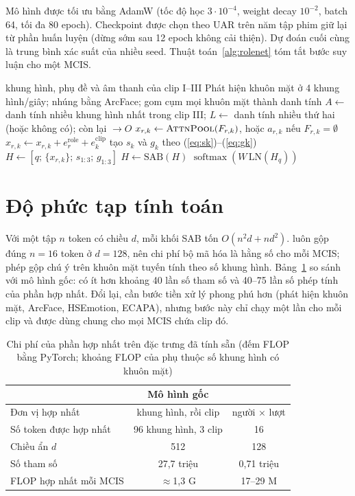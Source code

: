 Mô hình được tối ưu bằng AdamW (tốc độ học $3\cdot10^{-4}$, weight decay $10^{-2}$, batch 64, tối đa 80 epoch). Checkpoint được chọn theo UAR trên năm tập phim giữ lại từ phần huấn luyện (dừng sớm sau 12 epoch không cải thiện). Dự đoán cuối cùng là trung bình xác suất của nhiều seed. Thuật toán~\ref{alg:rolenet} tóm tắt bước suy luận cho một MCIS.

\begin{algorithm}[!htb]
\caption{Bước suy luận của \model{} cho một MCIS}
\label{alg:rolenet}
\begin{algorithmic}[1]
\Require khung hình, phụ đề và âm thanh của clip I--III
\State Phát hiện khuôn mặt ở 4 khung hình/giây; nhúng bằng ArcFace; gom cụm mọi khuôn mặt thành danh tính
\State $A \gets$ danh tính nhiều khung hình nhất trong clip III; $L \gets$ danh tính nhiều thứ hai (hoặc không có); còn lại $\to O$
  \State $x_{r,k} \gets \textsc{AttnPool}(F_{r,k})$, hoặc $a_{r,k}$ nếu $F_{r,k} = \emptyset$
  \State $x_{r,k} \gets x_{r,k} + e^{\text{role}}_r + e^{\text{clip}}_k$
\EndFor
{} \State tạo $s_k$ và $g_k$ theo (\ref{eq:sk})--(\ref{eq:gk}) \EndFor
\State $H \gets [q;\, \{x_{r,k}\};\, s_{1:3};\, g_{1:3}]$ 
 \State $H \gets \mathrm{SAB}(H)$ \EndFor
\State \Return $\operatorname{softmax}(W\,\mathrm{LN}(H_q))$
\end{algorithmic}
\end{algorithm}

\section{Độ phức tạp tính toán}

Với một tập $n$ token có chiều $d$, mỗi khối SAB tốn $O(n^2 d + n d^2)$. \model{} luôn gộp đúng $n = 16$ token ở $d = 128$, nên chi phí bộ mã hóa là hằng số cho mỗi MCIS; phép gộp chú ý trên khuôn mặt tuyến tính theo số khung hình. Bảng~\ref{tab:complexity} so sánh với mô hình gốc: \model{} có ít hơn khoảng 40 lần số tham số và 40--75 lần số phép tính của phần hợp nhất. Đổi lại, \model{} cần bước tiền xử lý phong phú hơn (phát hiện khuôn mặt, ArcFace, HSEmotion, ECAPA), nhưng bước này chỉ chạy một lần cho mỗi clip và được dùng chung cho mọi MCIS chứa clip đó.

\begin{table}[!htb]
\centering
\caption{Chi phí của phần hợp nhất trên đặc trưng đã tính sẵn (đếm FLOP bằng PyTorch; khoảng FLOP của \model{} phụ thuộc số khung hình có khuôn mặt)}
\label{tab:complexity}
\begin{tabular}{lcc}
\toprule
 & Mô hình gốc & \model{} \\
\midrule
Đơn vị hợp nhất & khung hình, rồi clip & người $\times$ lượt \\
Số token được hợp nhất & 96 khung hình, 3 clip & 16 \\
Chiều ẩn $d$ & 512 & 128 \\
Số tham số & 27,7 triệu & 0,71 triệu \\
FLOP hợp nhất mỗi MCIS & $\approx$1,3 G & 17--29 M \\
\bottomrule
\end{tabular}
\end{table}

